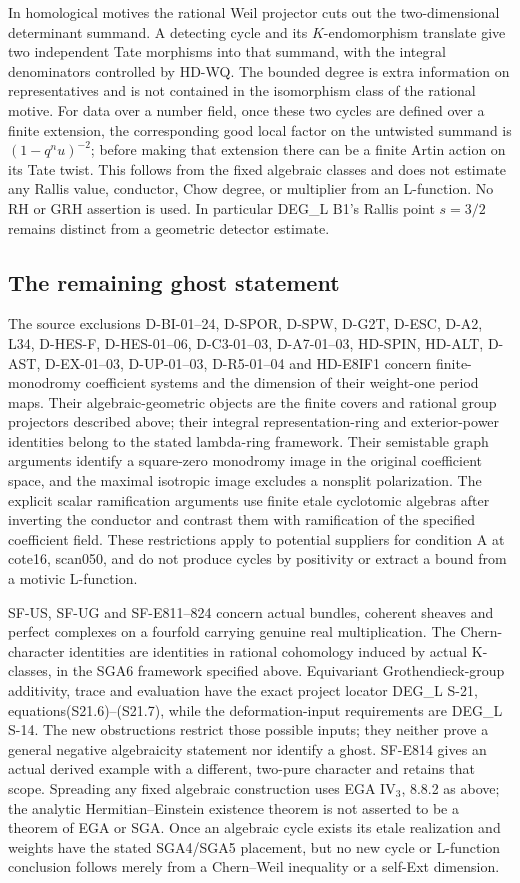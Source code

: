 In homological motives the rational Weil projector cuts out the
two-dimensional determinant summand. A detecting cycle and its
$K$-endomorphism translate give two independent Tate morphisms into
that summand, with the integral denominators controlled by HD-WQ.
The bounded degree is extra information on representatives and is
not contained in the isomorphism class of the rational motive.
For data over a number field, once these two cycles are defined over
a finite extension, the corresponding good local factor on the
untwisted summand is $(1-q^n u)^{-2}$; before making that extension
there can be a finite Artin action on its Tate twist. This follows
from the fixed algebraic classes and does not estimate any Rallis
value, conductor, Chow degree, or multiplier from an L-function.
No RH or GRH assertion is used. In particular DEG\_L B1's Rallis
point $s=3/2$ remains distinct from a geometric detector estimate.

\subsection{The remaining ghost statement}
The source exclusions D-BI-01--24, D-SPOR, D-SPW, D-G2T,
D-ESC, D-A2, L34, D-HES-F, D-HES-01--06, D-C3-01--03, D-A7-01--03, HD-SPIN, HD-ALT, D-AST, D-EX-01--03, D-UP-01--03,
D-R5-01--04 and HD-E8IF1 concern finite-monodromy coefficient
systems and the dimension of their weight-one period maps. Their
algebraic-geometric objects are the finite covers and rational group
projectors described above; their integral representation-ring and
exterior-power identities belong to the stated lambda-ring framework.
Their semistable graph arguments identify a square-zero monodromy
image in the original coefficient space, and the maximal isotropic
image excludes a nonsplit polarization. The explicit scalar
ramification arguments use finite etale cyclotomic algebras after
inverting the conductor and contrast them with ramification of the
specified coefficient field. These restrictions apply to potential
suppliers for condition A at cote16, scan050, and do not produce
cycles by positivity or extract a bound from a motivic L-function.

SF-US, SF-UG and SF-E811--824 concern actual bundles, coherent sheaves and perfect complexes on a
fourfold carrying genuine real multiplication. The Chern-character
identities are identities in rational cohomology induced by actual
K-classes, in the SGA6 framework specified above. Equivariant
Grothendieck-group additivity, trace and evaluation have the exact
project locator DEG\_L S-21, equations(S21.6)--(S21.7), while the
deformation-input requirements are DEG\_L S-14. The new obstructions
restrict those possible inputs; they neither prove a general negative
algebraicity statement nor identify a ghost. SF-E814 gives an actual
derived example with a different, two-pure character and retains that
scope. Spreading any fixed algebraic construction uses EGA IV$_3$,
8.8.2 as above; the analytic Hermitian--Einstein existence theorem is
not asserted to be a theorem of EGA or SGA. Once an algebraic cycle
exists its etale realization and weights have the stated SGA4/SGA5
placement, but no new cycle or L-function conclusion follows merely
from a Chern--Weil inequality or a self-Ext dimension.

